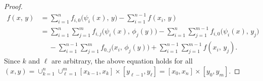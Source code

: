 \documentclass[review,hidelinks,onefignum,onetabnum]{siamart250211}
\begin{document}
\begin{proof}
\begin{equation*}
    \begin{split}          
        f( x, \, y)
        &=\sum_{i=1}^n f_{i,0}\Big( \psi_i(x), \, y\Big)-  \sum_{i=1}^{n-1} f( x_i, \, y)
        \\& =\sum_{i=1}^n \sum_{j=1}^m f_{i,j}\Big( \psi_i(x), \, \phi_j(y)\Big)-
        \sum_{i=1}^n\sum_{j=1}^{m-1} f_{i,0}\Big(\psi_i(x),\, y_{j}\Big)
           \\& \quad\  -  \sum_{i=1}^{n-1} \sum_{j=1}^m f_{0,j}\Big( x_i, \, \phi_j(y)\Big)+
        \sum_{i=1}^{n-1}\sum_{j=1}^{m-1} f (x_i,\, y_{j}).
    \end{split}
\end{equation*}
Since $k$ and $\ell$ are arbitrary, the above equation holds for all
$(x,y)=\cup_{k=1}^n\cup_{\ell=1}^m[x_{k-1}, x_k]\times [y_{\ell-1}, y_\ell]= [x_0,x_n]\times [y_0,y_m]$.
\end{proof}

\end{document}

